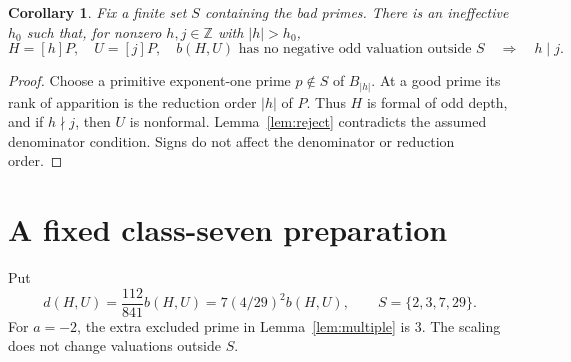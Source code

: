 \documentclass[11pt]{article}
\newtheorem{corollary}[theorem]{Corollary}
\newcommand{\Z}{\mathbb Z}
\begin{document}
\begin{corollary}\label{cor:division}
Fix a finite set \(S\) containing the bad primes. There is an
ineffective \(h_0\) such that, for nonzero \(h,j\in\Z\) with
\(|h|>h_0\),
\[
 H=[h]P,\quad U=[j]P,\quad
 b(H,U)\text{ has no negative odd valuation outside }S
 \quad\Longrightarrow\quad h\mid j.
\]
\end{corollary}
\begin{proof}
Choose a primitive exponent-one prime \(p\notin S\) of \(B_{|h|}\).
At a good prime its rank of apparition is the reduction order
\(|h|\) of \(P\). Thus \(H\) is formal of odd depth, and if
\(h\nmid j\), then \(U\) is nonformal. Lemma~\ref{lem:reject}
contradicts the assumed denominator condition. Signs do not affect
the denominator or reduction order.
\end{proof}

\section{A fixed class-seven preparation}

Put
\begin{equation}\label{eq:d}
               d(H,U)=\frac{112}{841}b(H,U)
                     =7(4/29)^2b(H,U),\qquad
               S=\{2,3,7,29\}.
\end{equation}
For \(a=-2\), the extra excluded prime in Lemma~\ref{lem:multiple}
is \(3\). The scaling does not change valuations outside \(S\).
\end{document}
